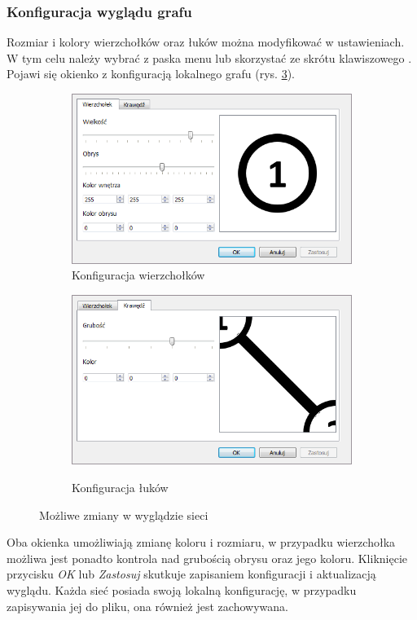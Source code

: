 \subsubsection{Konfiguracja wyglądu grafu}
Rozmiar i kolory wierzchołków oraz łuków można modyfikować w ustawieniach. W tym celu należy wybrać z paska menu  lub skorzystać ze skrótu klawiszowego . Pojawi się okienko z konfiguracją lokalnego grafu (rys. \ref{fig:grafConfig}).
\begin{figure}[H]
	\centering
	\begin{subfigure}{0.45\textwidth}
		\includegraphics[width=0.9\linewidth]{./img/spec_zew04_1.png}
		\caption{Konfiguracja wierzchołków}
		\label{fig:grafConfig1}
	\end{subfigure}
	\begin{subfigure}{0.45\textwidth}
		\includegraphics[width=0.9\linewidth]{./img/spec_zew04_2.png}
		\label{fig:grafConfig2}
		\caption{Konfiguracja łuków}
	\end{subfigure}
	\caption{Możliwe zmiany w wyglądzie sieci}
	\label{fig:grafConfig}
\end{figure}
Oba okienka umożliwiają zmianę koloru i rozmiaru, w przypadku wierzchołka możliwa jest ponadto kontrola nad grubością obrysu oraz jego koloru. Kliknięcie przycisku \textit{OK} lub \textit{Zastosuj} skutkuje zapisaniem konfiguracji i aktualizacją wyglądu. Każda sieć posiada swoją lokalną konfigurację, w przypadku zapisywania jej do pliku, ona również jest zachowywana.
